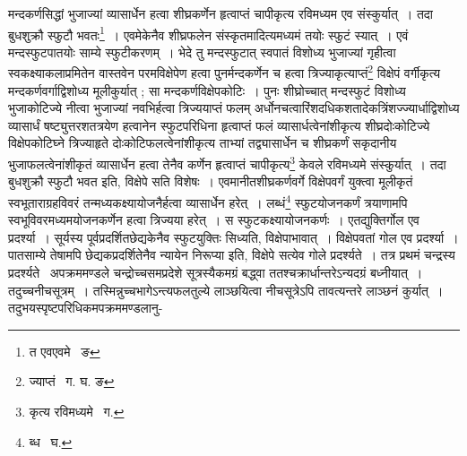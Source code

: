 \documentclass[11pt, openany]{book}
\begin{document}
\noindent मन्दकर्णसिद्धां भुजाज्यां व्यासार्धेन हत्वा शीघ्रकर्णेन हृत्वाप्तं चापीकृत्य रविमध्यम एव संस्कुर्यात्~। तदा बुधशुक्रौ स्फुटौ भवतः\renewcommand{\thefootnote}{१}\footnote{त एवएवमे \textendash\ ङ}~। एवमेकेनैव शीघ्रफलेन संस्कृतमादित्यमध्यमं तयोः स्फुटं स्यात्~। एवं मन्दस्फुटपातयोः साम्ये स्फुटीकरणम्~। भेदे तु मन्दस्फुटात् स्वपातं विशोध्य भुजाज्यां गृहीत्वा स्वकक्ष्याकलाप्रमितेन वास्तवेन परमविक्षेपेण हत्वा पुनर्मन्दकर्णेन च हत्वा त्रिज्याकृत्याप्तं\renewcommand{\thefootnote}{२}\footnote{ज्याप्तं \textendash\ ग. घ. ङ} विक्षेपं वर्गीकृत्य मन्दकर्णवर्गाद्विशोध्य मूलीकुर्यात् ; सा मन्दकर्णविक्षेपकोटिः~। पुनः शीघ्रोच्चात् मन्दस्फुटं विशोध्य भुजाकोटिज्ये नीत्वा भुजाज्यां नवभिर्हत्वा त्रिज्ययाप्तं फलम् अर्धोनचत्वारिंशदधिकशतादेकत्रिंशज्ज्यार्धाद्विशोध्य व्यासार्धं षष्ट्युत्तरशतत्रयेण हत्वानेन स्फुटपरिधिना हृत्वाप्तं फलं व्यासार्धत्वेनांशीकृत्य शीघ्रदोःकोटिज्ये विक्षेपकोटिघ्ने त्रिज्याहृते दोःकोटिफलत्वेनांशीकृत्य ताभ्यां तद्व्यासार्धेन च शीघ्रकर्णं सकृदानीय भुजाफलत्वेनांशीकृतं व्यासार्धेन हत्वा तेनैव कर्णेन हृत्वाप्तं चापीकृत्य\renewcommand{\thefootnote}{३}\footnote{कृत्य रविमध्यमे \textendash\ ग.} केवले रविमध्यमे संस्कुर्यात्~। 
तदा बुधशुक्रौ स्फुटौ भवत इति, विक्षेपे सति विशेषः~। एवमानीतशीघ्रकर्णवर्गे विक्षेपवर्गं युक्त्वा मूलीकृतं स्वभूताराग्रहविवरं तन्मध्यकक्ष्यायोजनैर्हत्वा व्यासार्धेन हरेत्~। लब्धं\renewcommand{\thefootnote}{४}\footnote{ब्ध \textendash\ घ.} स्फुटयोजनकर्णं त्रयाणामपि स्वभूविवरमध्यमयोजनकर्णेन हत्वा त्रिज्यया हरेत्~। स स्फुटकक्ष्यायोजनकर्णः~। एतद्युक्तिर्गोल एव प्रदर्श्या~। 
सूर्यस्य पूर्वप्रदर्शितछेद्यकेनैव स्फुटयुक्तिः सिध्यति, विक्षेपाभावात्~। विक्षेपवतां गोल एव प्रदर्श्या~। पातसाम्ये तेषामपि छेद्यकप्रदर्शितेनैव न्यायेन निरूप्या इति, विक्षेपे सत्येव गोले प्रदर्श्यते~। तत्र प्रथमं चन्द्रस्य प्रदर्श्यते \textendash\ अपक्रममण्डले चन्द्रोच्चसमप्रदेशे सूत्रस्यैकमग्रं 
बद्ध्वा ततश्चक्रार्धान्तरेऽन्यदग्रं बध्नीयात्~। तदुच्चनीचसूत्रम्~। तस्मिन्नुच्चभागेऽन्त्यफलतुल्ये लाञ्छयित्वा नीचसूत्रेऽपि तावत्यन्तरे लाञ्छनं कुर्यात्~। 
तदुभयस्पृष्टपरिधिकमपक्रममण्डलानु- 

\newpage
\end{document}
